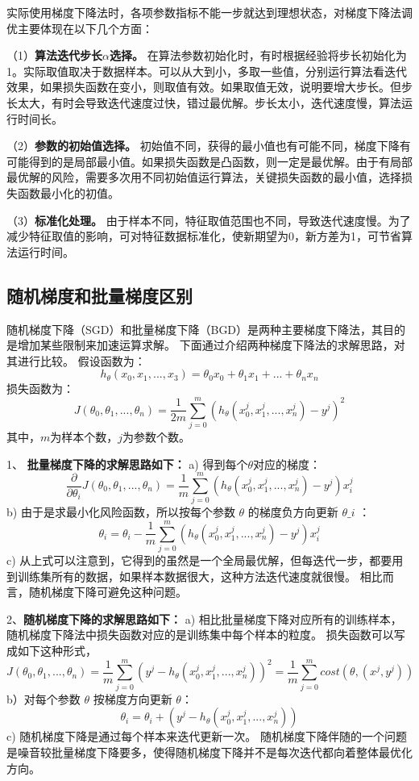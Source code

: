 实际使用梯度下降法时，各项参数指标不能一步就达到理想状态，对梯度下降法调优主要体现在以下几个方面：

（1）\textbf{算法迭代步长$\alpha$选择。}
在算法参数初始化时，有时根据经验将步长初始化为1。实际取值取决于数据样本。可以从大到小，多取一些值，分别运行算法看迭代效果，如果损失函数在变小，则取值有效。如果取值无效，说明要增大步长。但步长太大，有时会导致迭代速度过快，错过最优解。步长太小，迭代速度慢，算法运行时间长。

（2）\textbf{参数的初始值选择。}
初始值不同，获得的最小值也有可能不同，梯度下降有可能得到的是局部最小值。如果损失函数是凸函数，则一定是最优解。由于有局部最优解的风险，需要多次用不同初始值运行算法，关键损失函数的最小值，选择损失函数最小化的初值。

（3）\textbf{标准化处理。}
由于样本不同，特征取值范围也不同，导致迭代速度慢。为了减少特征取值的影响，可对特征数据标准化，使新期望为0，新方差为1，可节省算法运行时间。

\subsection{随机梯度和批量梯度区别}\label{ux968fux673aux68afux5ea6ux548cux6279ux91cfux68afux5ea6ux533aux522b}

​
随机梯度下降（SGD）和批量梯度下降（BGD）是两种主要梯度下降法，其目的是增加某些限制来加速运算求解。
下面通过介绍两种梯度下降法的求解思路，对其进行比较。 假设函数为： \[
h_\theta (x_0,x_1,...,x_3) = \theta_0 x_0 + \theta_1 x_1 + ... + \theta_n x_n
\] 损失函数为： \[
J(\theta_0, \theta_1, ... , \theta_n) = 
            \frac{1}{2m} \sum^{m}_{j=0}(h_\theta (x^{j}_0
    ,x^{j}_1,...,x^{j}_n)-y^j)^2
\] 其中，$m​$为样本个数，$j​$为参数个数。

1、 \textbf{批量梯度下降的求解思路如下：} a) 得到每个$
\theta ​$对应的梯度： \[
\frac{\partial}{\partial \theta_i}J({\theta}_0,{\theta}_1,...,{\theta}_n)=\frac{1}{m}\sum^{m}_{j=0}(h_\theta (x^{j}_0
    ,x^{j}_1,...,x^{j}_n)-y^j)x^{j}_i
\] b) 由于是求最小化风险函数，所以按每个参数 $ \theta ​$
的梯度负方向更新 $ \theta\_i ​$ ： \[
\theta_i=\theta_i - \frac{1}{m} \sum^{m}_{j=0}(h_\theta (x^{j}_0
    ,x^{j}_1,...,x^{j}_n)-y^j)x^{j}_i
\] c)
从上式可以注意到，它得到的虽然是一个全局最优解，但每迭代一步，都要用到训练集所有的数据，如果样本数据很大，这种方法迭代速度就很慢。
相比而言，随机梯度下降可避免这种问题。

2、\textbf{随机梯度下降的求解思路如下：} a)
相比批量梯度下降对应所有的训练样本，随机梯度下降法中损失函数对应的是训练集中每个样本的粒度。
损失函数可以写成如下这种形式， \[
J(\theta_0, \theta_1, ... , \theta_n) = 
            \frac{1}{m} \sum^{m}_{j=0}(y^j - h_\theta (x^{j}_0
            ,x^{j}_1,...,x^{j}_n))^2 = 
            \frac{1}{m} \sum^{m}_{j=0} cost(\theta,(x^j,y^j))
\] b）对每个参数 $ \theta​$ 按梯度方向更新 $ \theta​$： \[
\theta_i = \theta_i + (y^j - h_\theta (x^{j}_0, x^{j}_1, ... ,x^{j}_n))
\] c) 随机梯度下降是通过每个样本来迭代更新一次。
随机梯度下降伴随的一个问题是噪音较批量梯度下降要多，使得随机梯度下降并不是每次迭代都向着整体最优化方向。

